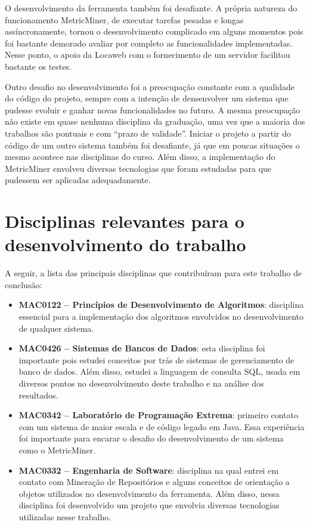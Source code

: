 \documentclass[a4paper, 12pt, twoside]{book}
\begin{document}
    O desenvolvimento da ferramenta também foi desafiante. A própria natureza do funcionamento MetricMiner, de executar tarefas pesadas e longas assíncronamente, tornou o desenvolvimento complicado em alguns momentos pois foi bastante demorado avaliar por completo as funcionalidades implementadas. Nesse ponto, o apoio da Locaweb com o fornecimento de um servidor facilitou bastante os testes.

    Outro desafio no desenvolvimento foi a preocupação constante com a qualidade do código do projeto, sempre com a intenção de densenvolver um sistema que pudesse evoluir e ganhar novas funcionalidades no futuro. A mesma preocupação não existe em quase nenhuma disciplina da graduação, uma vez que a maioria dos trabalhos são pontuais e com ``prazo de validade''. Iniciar o projeto a partir do código de um outro sistema também foi desafiante, já que em poucas situações o mesmo acontece nas disciplinas do curso. Além disso, a implementação do MetricMiner envolveu diversas tecnologias que foram estudadas para que pudessem ser aplicadas adequadamente.

    \section{Disciplinas relevantes para o desenvolvimento do trabalho}

    A seguir, a lista das principais disciplinas que contribuíram para este trabalho de conclusão:
    \begin{itemize}
        \item {\bf MAC0122 -- Princípios de Desenvolvimento de Algoritmos}: disciplina essencial para a implementação dos algoritmos envolvidos no desenvolvimento de qualquer sistema.
        \item {\bf MAC0426 -- Sistemas de Bancos de Dados}: esta disciplina foi importante pois estudei conceitos por trás de sistemas de gerenciamento de banco de dados. Além disso, estudei a linguagem de consulta SQL, usada em diversos pontos no desenvolvimento deste trabalho e na análise dos resultados.
        \item {\bf MAC0342 -- Laboratório de Programação Extrema}: primeiro contato com um sistema de maior escala e de código legado em Java. Essa experiência foi importante para encarar o desafio do desenvolvimento de um sistema como o MetricMiner.
        \item {\bf MAC0332 -- Engenharia de Software}: disciplina na qual entrei em contato com Mineração de Repositórios e alguns conceitos de orientação a objetos utilizados no desenvolvimento da ferramenta. Além disso, nessa disciplina foi desenvolvido um projeto que envolvia diversas tecnologias utilizadas nesse trabalho.
    \end{itemize}
\end{document}
